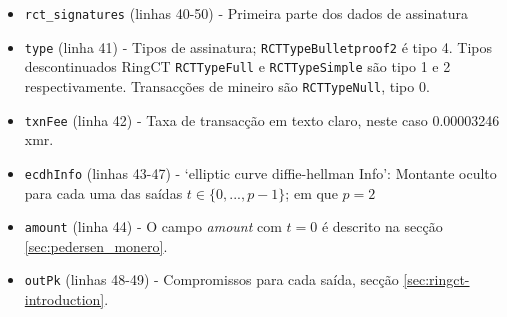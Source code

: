 \begin{appendices}
\begin{itemize}
	\item {\tt rct\_signatures} (linhas 40-50) - Primeira parte dos dados de assinatura 
	\item {\tt type} (linha 41) - Tipos de assinatura; {\tt RCTTypeBulletproof2} é tipo 4. Tipos descontinuados RingCT {\tt RCTTypeFull} e {\tt RCTTypeSimple} são tipo 1 e 2 respectivamente. Transacções de mineiro são {\tt RCTTypeNull}, tipo 0.
	\item {\tt txnFee} (linha 42) - Taxa de transacção em texto claro, neste caso 0.00003246 xmr.
	\item {\tt ecdhInfo} (linhas 43-47) - ‘elliptic curve diffie-hellman Info’: 
Montante oculto para cada uma das saídas $t \in \{0, ..., p-1\}$; em que $p = 2$
    \item {\tt amount} (linha 44) - O campo {\sl amount} com $t = 0$ é descrito na secção \ref{sec:pedersen_monero}.
    \item {\tt outPk} (linhas 48-49) - Compromissos para cada saída, secção \ref{sec:ringct-introduction}.


\end{itemize}
\end{appendices}

